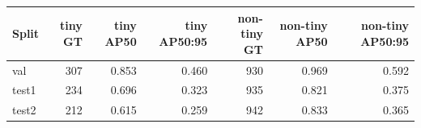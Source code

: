 \begin{tabular}{lrrrrrr}
\toprule
Split & tiny GT & tiny AP50 & tiny AP50:95 & non-tiny GT & non-tiny AP50 & non-tiny AP50:95 \\
\midrule
val & 307 & 0.853 & 0.460 & 930 & 0.969 & 0.592 \\
test1 & 234 & 0.696 & 0.323 & 935 & 0.821 & 0.375 \\
test2 & 212 & 0.615 & 0.259 & 942 & 0.833 & 0.365 \\
\bottomrule
\end{tabular}
